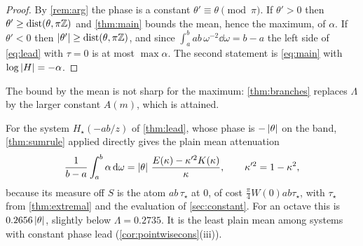 \begin{proof}
By \cref{rem:arg} the phase is a constant $\theta'\equiv\theta\pmod\pi$. If
$\theta'>0$ then $\theta'\ge\operatorname{dist}(\theta,\pi\mathbb Z)$ and \cref{thm:main} bounds
the mean, hence the maximum, of $\alpha$. If $\theta'<0$ then
$\left|\theta'\right|\ge\operatorname{dist}(\theta,\pi\mathbb Z)$, and since
$\int_a^bab\,\omega^{-2}\dd\omega=b-a$ the left side of \eqref{eq:lead}
with $\tau=0$ is at most $\max\alpha$. The
second statement is \eqref{eq:main} with $\log\left|H\right|=-\alpha$.
\end{proof}

The bound by the mean is not sharp for the maximum: \cref{thm:branches}
replaces $\Lambda$ by the larger constant $A(m)$, which is attained.

\begin{remark}\label{rem:leadmean}
For the system $H_\star(-ab/z)$ of \cref{thm:lead}, whose phase is
$-\left|\theta\right|$ on the band, \cref{thm:sumrule} applied directly gives the
plain mean attenuation
\[
\frac1{b-a}\int_a^b\alpha\,\mathrm d\omega
=\left|\theta\right|\,\frac{E(\kappa)-\kappa'^2K(\kappa)}{\kappa},\qquad\kappa'^2=1-\kappa^2,
\]
because its measure off $S$ is the atom $ab\,\tau_\star$ at $0$, of cost
$\frac\pi4W(0)ab\tau_\star$, with $\tau_\star$ from \cref{thm:extremal} and the
evaluation of \cref{sec:constant}. For an octave this is $0.2656\left|\theta\right|$,
slightly below $\Lambda=0.2735$. It is the least plain mean among systems
with constant phase lead (\cref{cor:pointwisecons}(iii)).
\end{remark}
